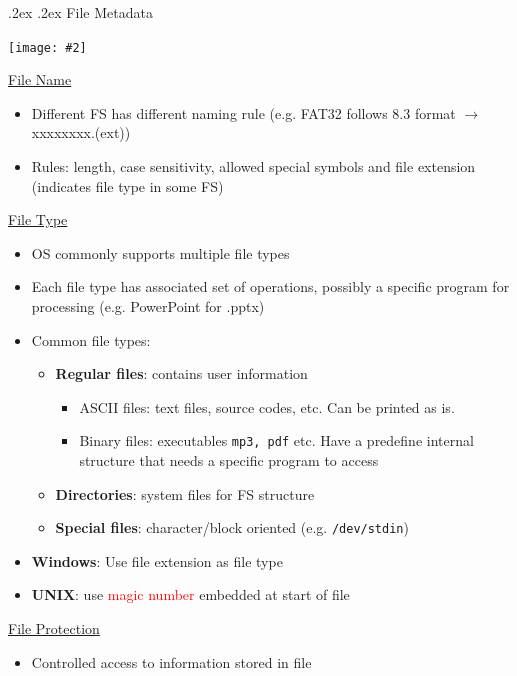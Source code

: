 \documentclass[13pt,landscape,a4paper]{article}
\makeatletter
\newcommand\ctrimg[2][0.8]{\begin{center}\texttt{[image: \#2]} \end{center}}
\newcommand\red[1]{\textcolor{red}{#1}}
\renewcommand{\subsubsection}{\@startsection{subsubsection}{1}{0mm}%
    {.2ex}%
    {.2ex}%
    {\rmfamily\bfseries}}
\makeatother
\begin{document}
\begin{multicols*}{3}
        \subsubsection{File Metadata}
        \ctrimg{metadata}
        \underline{File Name}
        \begin{itemize}
            \item Different FS has different naming rule (e.g. FAT32 follows 8.3 format $\rightarrow$ xxxxxxxx.(ext))
            \item Rules: length, case sensitivity, allowed special symbols and file extension (indicates file type in some FS)
        \end{itemize}
        \columnbreak
        \underline{File Type}
        \begin{itemize}
            \item OS commonly supports multiple file types
            \item Each file type has associated set of operations, possibly a specific program for processing (e.g. PowerPoint for .pptx)
            \item Common file types:
            \begin{itemize}
                \item \textbf{Regular files}: contains user information
                \begin{itemize}
                    \item ASCII files: text files, source codes, etc. Can be printed as is.
                    \item Binary files: executables \texttt{mp3, pdf} etc. Have a predefine internal structure that needs a specific program to access
                \end{itemize}
                \item \textbf{Directories}: system files for FS structure
                \item \textbf{Special files}: character/block oriented (e.g. \texttt{/dev/stdin})
            \end{itemize}
            \item \textbf{Windows}: Use file extension as file type
            \item \textbf{UNIX}: use \red{magic number} embedded at start of file
        \end{itemize}
        \underline{File Protection}
        \begin{itemize}
            \item Controlled access to information stored in file

\end{itemize}
\end{multicols*}
\end{document}
